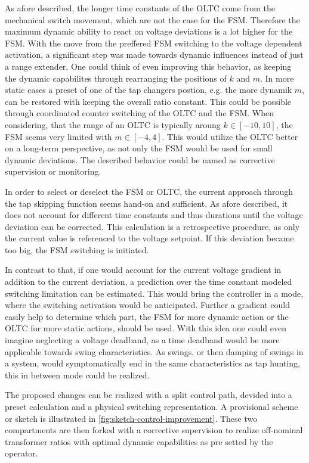 As afore described, the longer time constants of the \acs{OLTC} come from the mechanical switch movement, which are not the case for the \acs{FSM}.
Therefore the maximum dynamic ability to react on voltage deviations is a lot higher for the \acs{FSM}.
With the move from the preffered \acs{FSM} switching to the voltage dependent activation, a significant step was made towards dynamic influences instead of just a \glqq range extender\grqq.
One could think of even improving this behavior, as keeping the dynamic capabilites through rearranging the positions of $k$ and $m$.
In more static cases a preset of one of the tap changers postion, e.g. the more dynamik $m$, can be restored with keeping the overall ratio constant.
This could be possible through coordinated counter switching of the \acs{OLTC} and the \acs{FSM}.
When considering, that the range of an \acs{OLTC} is typically aroung $k \in [-10,10]$, the FSM seems very limited with $m \in [-4,4]$.
This would utilize the \acs{OLTC} better on a long-term perspective, as not only the FSM would be used for small dynamic deviations.
The described behavior could be named as corrective supervision or monitoring. 

In order to select or deselect the \acs{FSM} or \acs{OLTC}, the current approach through the tap skipping function seems hand-on and sufficient.
As afore described, it does not account for different time constants and thus durations until the voltage deviation can be corrected.
This calculation is a retrospective procedure, as only the current value is referenced to the voltage setpoint.
If this deviation became too big, the \acs{FSM} switching is initiated.

In contrast to that, if one would account for the current voltage gradient in addition to the current deviation, a prediction over the time constant modeled switching limitation can be estimated.
This would bring the controller in a mode, where the switching activation would be anticipated.
Further a gradient could easily help to determine which part, the \acs{FSM} for more dynamic action or the \acs{OLTC} for more static actions, should be used.
With this idea one could even imagine neglecting a voltage deadband, as a time deadband would be more applicable towards swing characteristics. 
As swings, or then damping of swings in a system, would symptomatically end in the same characteristics as tap hunting, this in between mode could be realized.

The proposed changes can be realized with a split control path, devided into a preset calculation and a physical switching representation.
A provisional scheme or sketch is illustrated in \autoref{fig:sketch-control-improvement}. 
These two compartments are then forked with a corrective supervision to realize off-nominal transformer ratios with optimal dynamic capabilities as pre setted by the operator.

